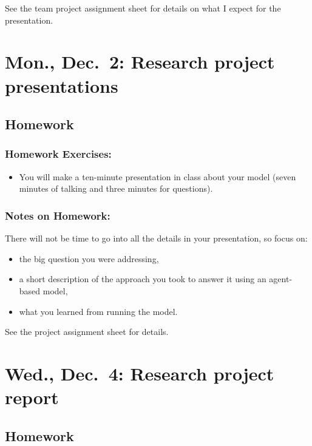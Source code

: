 \documentclass[
]{article}
\providecommand{\tightlist}{%
  \setlength{\itemsep}{0pt}\setlength{\parskip}{0pt}}
\begin{document}
See the team project assignment sheet for details on what I expect for
the presentation.

\section{Mon., Dec.~2: Research project
presentations}\label{mon.-dec.-2-research-project-presentations}

\subsection{Homework}\label{homework-11}

\subsubsection{Homework Exercises:}\label{homework-exercises-11}

\begin{itemize}
\tightlist
\item
  You will make a ten-minute presentation in class about your model
  (seven minutes of talking and three minutes for questions).
\end{itemize}

\subsubsection{Notes on Homework:}\label{notes-on-homework-7}

There will not be time to go into all the details in your presentation,
so focus on:

\begin{itemize}
\tightlist
\item
  the big question you were addressing,
\item
  a short description of the approach you took to answer it using an
  agent-based model,
\item
  what you learned from running the model.
\end{itemize}

See the project assignment sheet for details.

\section{Wed., Dec.~4: Research project
report}\label{wed.-dec.-4-research-project-report}

\subsection{Homework}\label{homework-12}
\end{document}
